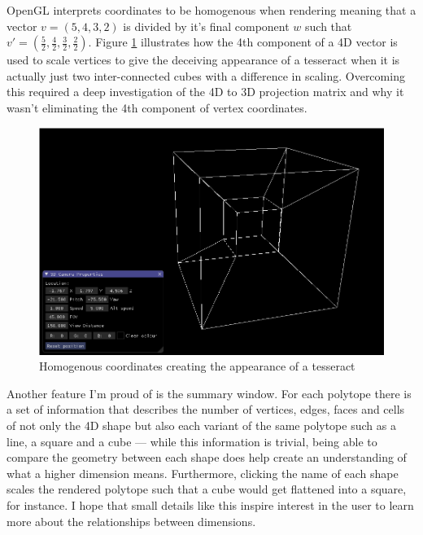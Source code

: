 \documentclass[11pt, a4paper]{article}
\begin{document}
OpenGL interprets coordinates to be homogenous when rendering \parencite{woo1999opengl} meaning that a vector $v = (5, 4, 3, 2)$ is divided by it's final component $w$ such that $v' = (\frac{5}{2}, \frac{4}{2}, \frac{3}{2}, \frac{2}{2})$. Figure \ref{fig:homogenous} illustrates how the 4th component of a 4D vector is used to scale vertices to give the deceiving appearance of a tesseract when it is actually just two inter-connected cubes with a difference in scaling. Overcoming this required a deep investigation of the 4D to 3D projection matrix and why it wasn't eliminating the 4th component of vertex coordinates.

\begin{figure}[!h]
  \centering
  \includegraphics[width=14cm]{img/fake_tesseract.png}
  \caption{Homogenous coordinates creating the appearance of a tesseract}
  \label{fig:homogenous}
\end{figure}

Another feature I'm proud of is the summary window. For each polytope there is a set of information that describes the number of vertices, edges, faces and cells of not only the 4D shape but also each variant of the same polytope such as a line, a square and a cube --- while this information is trivial, being able to compare the geometry between each shape does help create an understanding of what a higher dimension means. Furthermore, clicking the name of each shape scales the rendered polytope such that a cube would get flattened into a square, for instance. I hope that small details like this inspire interest in the user to learn more about the relationships between dimensions.
\end{document}
